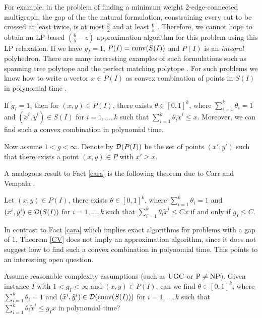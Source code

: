 For example, in the problem of finding a minimum weight 2-edge-connected multigraph, the gap of the the natural formulation, constraining every cut to be crossed at least twice, is at most $\frac{3}{2}$ \cite{Wolsey1980} and at least $\frac{6}{5}$ \cite{carr-ravi}. Therefore, we cannot hope to obtain an LP-based $(\frac{6}{5}-\epsilon)$-approximation algorithm for this problem using this LP relaxation. If we have $g_I=1$, $P(I)=\operatorname{conv}(S(I))$ and $P(I)$ is an \textit{integral} polyhedron. There are many interesting examples of such formulations such as spanning tree polytope and the perfect matching polytope \cite{schrijver}. For such problems we know how to write a vector $x\in P(I)$ as convex combination of points in $S(I)$ in polynomial time \cite{cons-cara}.

\begin{fact}\label{cara}
	If $g_I=1$, then for $(x,y)\in P(I)$, there exists $\theta \in [0,1]^k$, where $\sum_{i=1}^{k}\theta_i =1$ and $(\tilde{x}^i,\tilde{y}^i)\in S(I)$ for $i=1,\ldots,k$ such that $\sum_{i=1}^{k}\theta_i \tilde{x}^i\leq x$. Moreover, we can find such a convex combination in polynomial time.
\end{fact}

	Now assume $1<g<\infty$. Denote by $\operatorname{\mathcal{D}}(P(I))$ be the set of points $(x',y')$ such that there exists a point $(x,y)\in P$ with $x'\geq x$.
	
	A analogous result to Fact \ref{cara} is the following theorem due to Carr and Vempala \cite{CV}. 
	
\begin{theorem} \label{CV}
	Let $(x,y)\in P(I)$, there exists $\theta \in [0,1]^k$, where $\sum_{i=1}^{k}\theta_i =1$ and $(\tilde{x}^i,\tilde{y}^i)\in \operatorname{\mathcal{D}}(S(I))$ for $i=1,\ldots,k$ such that $\sum_{i=1}^{k}\theta_i \tilde{x}^i\leq Cx$ if and only if $g_I \leq C$.
\end{theorem}

In contrast to Fact \ref{cara} which implies exact algorithms for problems with a gap of 1, Theorem \ref{CV} does not imply an approximation algorithm, since it does not suggest how to find such a convex combination in polynomial time. This points to an interesting open question. 

\begin{question}\label{question1}
	Assume reasonable complexity assumptions (such as $\mathrm{UGC}$ or $\mathrm{P}\neq \mathrm{NP}$). Given instance $I$ with $1<g_I<\infty$ and $(x,y)\in P(I)$, can we find $\theta \in [0,1]^k$, where $\sum_{i=1}^{k}\theta_i =1$ and $(\tilde{x}^i,\tilde{y}^i)\in \operatorname{\mathcal{D}}(\operatorname{conv}(S(I)))$ for $i=1,\ldots,k$ such that $\sum_{i=1}^{k}\theta_i \tilde{x}^i\leq g_Ix$ in polynomial time?
\end{question}

